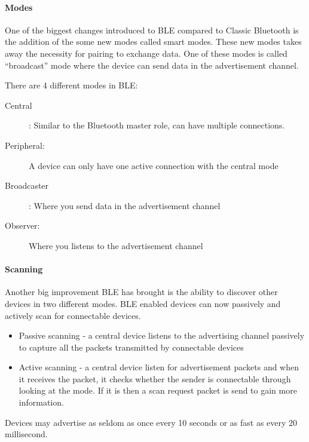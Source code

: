 \paragraph*{Modes\protect \\
}

One of the biggest changes introduced to BLE compared to Classic Bluetooth is the addition of the some new modes called smart modes\cite{bluetooth-chalmers}. These new modes takes
away the necessity for pairing to exchange data. One of these modes is called \textquotedblleft broadcast\textquotedblright{}
mode where the device can send data in the advertisement channel\cite{ble-modes}. 

There are 4 different modes in BLE: 
\begin{description}
\item [{Central}] : Similar to the Bluetooth master role, can have multiple
connections. 
\item [{Peripheral:}] A device can only have one active connection with
the central mode 
\item [{Broadcaster}] : Where you send data in the advertisement channel
\item [{Observer:}] Where you listens to the advertisement channel
\end{description}

\paragraph*{Scanning\protect \linebreak{}
}

Another big improvement BLE has brought is the ability to discover
other devices in two different modes. BLE enabled devices can now
passively and actively scan for connectable devices\cite{bluetooth-chalmers}.
\begin{itemize}
\item Passive scanning - a central device listens to the advertising channel
passively to capture all the packets transmitted by connectable devices 
\item Active scanning - a central device listen for advertisement packets
and when it receives the packet, it checks whether the sender is connectable
through looking at the mode. If it is then a scan request packet is
send to gain more information.
\end{itemize}
Devices may advertise as seldom as once every 10 seconds or as fast
as every 20 millisecond. 


